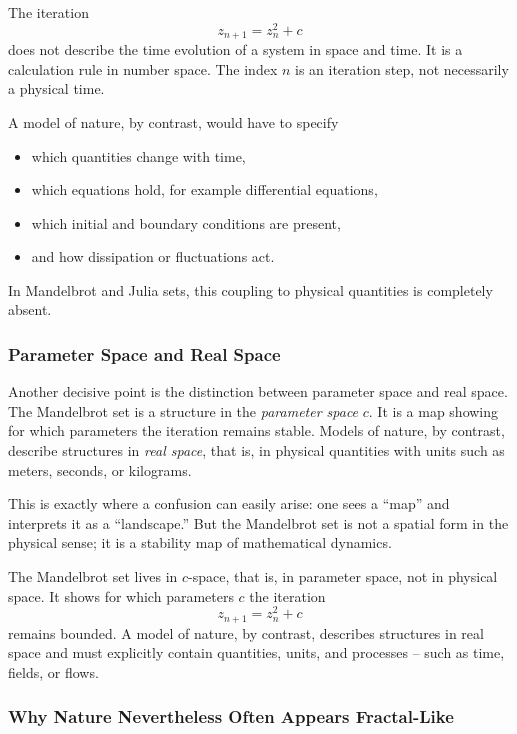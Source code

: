 The iteration
\[
z_{n+1}=z_n^2+c
\]
does not describe the time evolution of a system in space and time.
It is a calculation rule in number space.
The index \(n\) is an iteration step,
not necessarily a physical time.

A model of nature, by contrast, would have to specify
\begin{itemize}
	\item which quantities change with time,
	\item which equations hold, for example differential equations,
	\item which initial and boundary conditions are present,
	\item and how dissipation or fluctuations act.
\end{itemize}
In Mandelbrot and Julia sets, this coupling to physical quantities is completely absent.

\subsubsection*{Parameter Space and Real Space}

Another decisive point is the distinction between parameter space and real space.
The Mandelbrot set is a structure in the \emph{parameter space} \(c\).
It is a map showing
for which parameters the iteration remains stable.
Models of nature, by contrast, describe structures in \emph{real space},
that is, in physical quantities with units such as meters, seconds, or kilograms.

This is exactly where a confusion can easily arise:
one sees a ``map''
and interprets it as a ``landscape.''
But the Mandelbrot set is not a spatial form in the physical sense;
it is a stability map of mathematical dynamics.

\begin{NoteBox}
	\label{box:distinction}
	\small
	The Mandelbrot set lives in \(c\)-space,
	that is, in parameter space,
	not in physical space.
	It shows
	for which parameters \(c\) the iteration
	\[
	z_{n+1}=z_n^2+c
	\]
	remains bounded.
	A model of nature, by contrast, describes structures in real space
	and must explicitly contain quantities, units, and processes --
	such as time, fields, or flows.
\end{NoteBox}

\subsubsection*{Why Nature Nevertheless Often Appears Fractal-Like}

